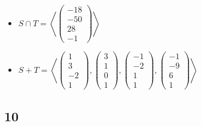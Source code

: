 \begin{itemize}
	\item $ S \cap T = \left\langle
    \begin{pmatrix}
    	-18 \\
        -50 \\
        28 \\
        -1
    \end{pmatrix} \right\rangle $
    \item $ S + T = \left\langle
    \begin{pmatrix}
        1 \\
        3 \\
        -2 \\
        1
    \end{pmatrix},
    \begin{pmatrix}
        3 \\
        1 \\
        0 \\
        1
    \end{pmatrix},
    \begin{pmatrix}
        -1 \\
        -2 \\
        1 \\
        1
    \end{pmatrix},
    \begin{pmatrix}
        -1 \\
        -9 \\
        6 \\
        1
    \end{pmatrix} \right\rangle $
\end{itemize}

\subsection{10}

